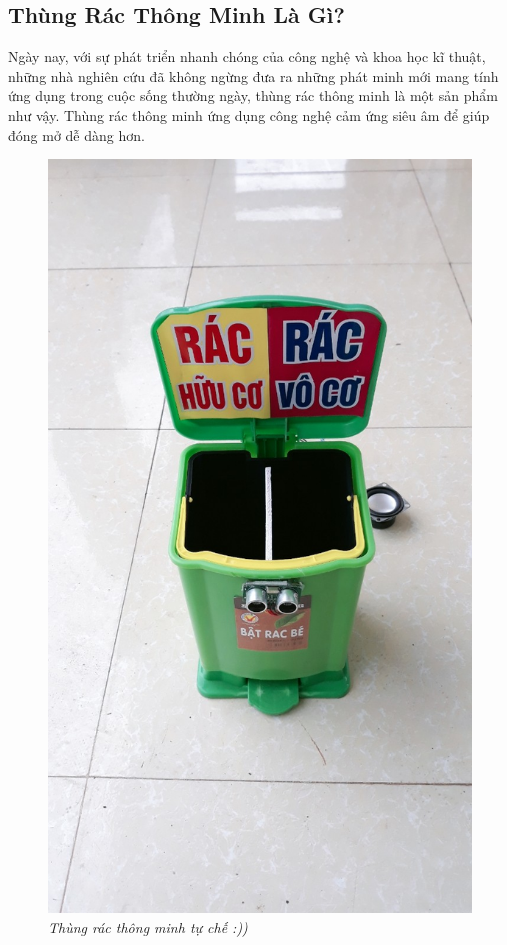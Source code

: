 \documentclass[12pt,a4paper]{article}
\begin{document}
\subsection{Thùng Rác Thông Minh Là Gì?}
\hspace{0.7cm}Ngày nay, với sự phát triển nhanh chóng của công nghệ và khoa học kĩ thuật, những nhà nghiên cứu đã không ngừng đưa ra những phát minh mới mang tính ứng dụng trong cuộc sống thường ngày, thùng rác thông minh là một sản phẩm như vậy. Thùng rác thông minh ứng dụng công nghệ cảm ứng siêu âm để giúp đóng mở dễ dàng hơn.
\newpage
\begin{figure}
    \centering
    \includegraphics[scale=0.2]{hinh 1}
    \caption{\textit{Thùng rác thông minh tự chế :))}}
    \label{fig1}
\end{figure}
\end{document}
